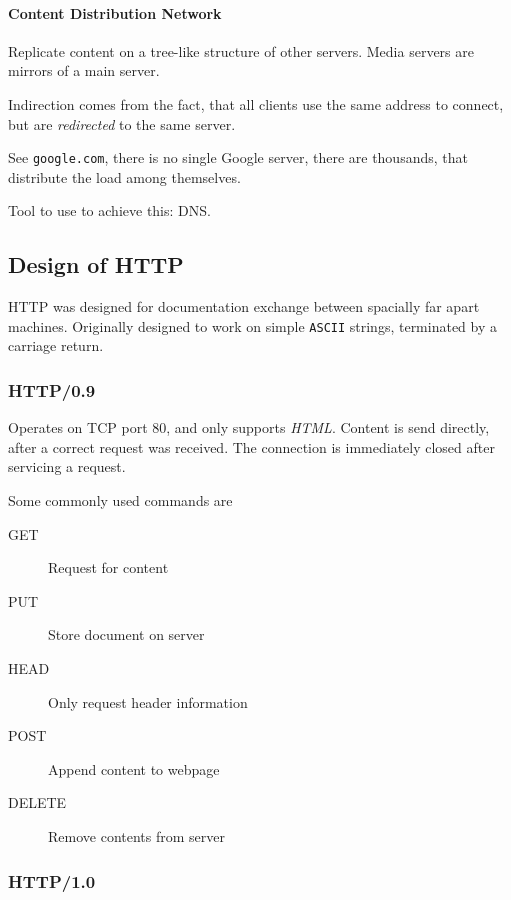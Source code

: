 \documentclass[english]{panikzettel}
\begin{document}
	\paragraph{Content Distribution Network}
	\label{pgf-content-distribution-network}	

	Replicate content on a tree-like structure of other servers. Media servers are mirrors of a main server. 

	Indirection comes from the fact, that all clients use the same address to connect, but are \textit{redirected} to the same server.

	See \texttt{google.com}, there is no single Google server, there are thousands, that distribute the load among themselves.

	Tool to use to achieve this: DNS.
	
	
	\subsection{Design of HTTP}
	\label{ss-design-of-http}
	
	HTTP was designed for documentation exchange between spacially far apart machines. Originally designed to work on simple \texttt{ASCII} strings, terminated by a carriage return.

	\subsubsection{HTTP/0.9}
	\label{sss-http-0.9}
	
		Operates on TCP port 80, and only supports \textit{HTML}.
		Content is send directly, after a correct request was received.
		The connection is immediately closed after servicing a request.

	Some commonly used commands are
	\begin{description}
		\item[GET] Request for content
		\item[PUT] Store document on server
		\item[HEAD] Only request header information
		\item[POST] Append content to webpage
		\item[DELETE] Remove contents from server
	\end{description}
	
	\subsubsection{HTTP/1.0}
	\label{sss-http-1.0}
	
\end{document}
